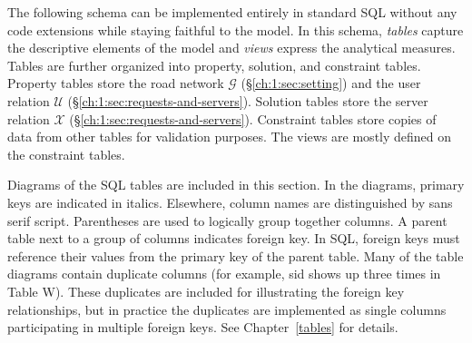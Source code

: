 The following schema can be implemented entirely in standard SQL without any
code extensions while staying faithful to the model.  In this schema,
\textit{tables} capture the descriptive elements of the model and
\textit{views} express the analytical measures.  Tables are further organized
into property, solution, and constraint tables.  Property
tables store the road network $\mathcal{G}$ (\S\ref{ch:1:sec:setting}) and the user
relation $\mathcal{U}$ (\S\ref{ch:1:sec:requests-and-servers}).  Solution tables
store the server relation $\mathcal{X}$ (\S\ref{ch:1:sec:requests-and-servers}).
Constraint tables store copies of data from other tables for validation
purposes.  The views are mostly defined on the constraint tables.

Diagrams of the SQL tables are included in this section. In the diagrams,
primary keys are indicated in italics. Elsewhere, column names are
distinguished by \textsf{sans serif} script.  Parentheses are used to logically
group together columns.  A parent table next to a group of columns indicates
foreign key. In SQL, foreign keys must reference their values from the primary
key of the parent table. Many of the table diagrams contain duplicate columns
(for example, \textsf{sid} shows up three times in Table W).  These duplicates
are included for illustrating the foreign key relationships, but in practice
the duplicates are implemented as single columns participating in multiple
foreign keys. See Chapter~\ref{tables} for details.

